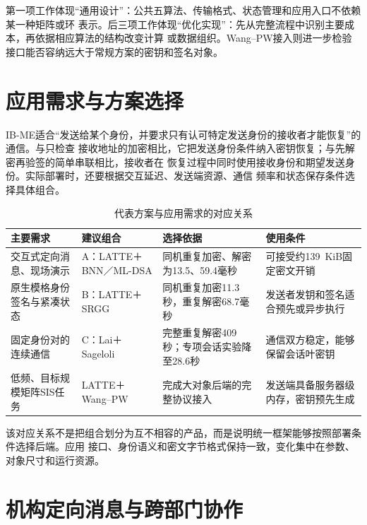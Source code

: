 第一项工作体现“通用设计”：公共五算法、传输格式、状态管理和应用入口不依赖某一种矩阵或环
表示。后三项工作体现“优化实现”：先从完整流程中识别主要成本，再依据相应算法的结构改变计算
或数据组织。Wang--PW接入则进一步检验接口能否容纳远大于常规方案的密钥和签名对象。

\section{应用需求与方案选择}

IB-ME适合“发送给某个身份，并要求只有认可特定发送身份的接收者才能恢复”的通信。与只检查
接收地址的加密相比，它把发送身份条件纳入密钥恢复；与先解密再验签的简单串联相比，接收者在
恢复过程中同时使用接收身份和期望发送身份。实际部署时，还要根据交互延迟、发送端资源、通信
频率和状态保存条件选择具体组合。

\begin{table}[H]
\centering\small
\caption{代表方案与应用需求的对应关系}
\label{tab:application-choice}
\begin{tabularx}{\textwidth}{@{}>{\raggedright\arraybackslash}p{}>{\raggedright\arraybackslash}p{}>{\raggedright\arraybackslash}p{}>{\raggedright\arraybackslash}X@{}}
\toprule
\rowcolor{black!8} 主要需求 & 建议组合 & 选择依据 & 使用条件 \\
\midrule
交互式定向消息、现场演示 & A：LATTE＋BNN／ML-DSA & 同机重复加密、解密为13.5、59.4毫秒 & 可接受约139~KiB固定密文开销 \\
原生模格身份签名与紧凑状态 & B：LATTE＋SRGG & 同机重复加密11.3秒，重复解密68.7毫秒 & 发送者发钥和签名适合预先或异步执行 \\
固定身份对的连续通信 & C：Lai＋Sageloli & 完整重复解密409秒；专项会话实验降至28.6秒 & 通信双方稳定，能够保留会话叶密钥 \\
低频、目标规模矩阵SIS任务 & LATTE＋Wang--PW & 完成大对象后端的完整协议接入 & 发送端具备服务器级内存，密钥预先生成 \\
\bottomrule
\end{tabularx}
\end{table}

该对应关系不是把组合划分为互不相容的产品，而是说明统一框架能够按照部署条件选择后端。应用
接口、身份语义和密文字节格式保持一致，变化集中在参数、对象尺寸和运行资源。

\section{机构定向消息与跨部门协作}

